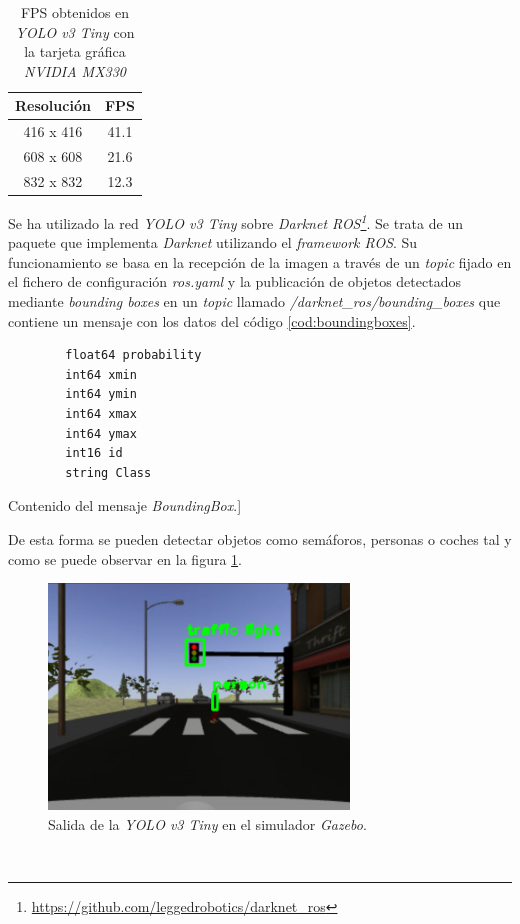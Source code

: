 \begin{table}[H]
	\begin{center}
		\begin{tabular}{|c|c|}
			\hline
			\textbf{Resolución}   & \textbf{FPS}
			\\
			\hline
			416 x 416							& 41.1
			\\
			608 x 608    					& 21.6
			\\
			832 x 832      				& 12.3
			\\
			\hline
		\end{tabular}
		\caption{FPS obtenidos en \textit{YOLO v3 Tiny} con la tarjeta gráfica \textit{NVIDIA MX330}}
		\label{table:versusnotebook}
	\end{center}
\end{table}



Se ha utilizado la red \textit{YOLO v3 Tiny} sobre \textit{Darknet ROS\footnote{\url{https://github.com/leggedrobotics/darknet_ros}}}. Se trata de un paquete que implementa \textit{Darknet} utilizando el \textit{framework ROS}. Su funcionamiento se basa en la recepción de la imagen a través de un \textit{topic} fijado en el fichero de configuración \textit{ros.yaml} y la publicación de objetos detectados mediante \textit{bounding boxes} en un \textit{topic} llamado \textit{/darknet\_ros/bounding\_boxes} que contiene un mensaje con los datos del código \ref{cod:boundingboxes}.\\

\begin{code}[h]
	\begin{lstlisting}
		float64 probability
		int64 xmin
		int64 ymin
		int64 xmax
		int64 ymax
		int16 id
		string Class
	\end{lstlisting}
	\caption[Contenido del mensaje \textit{BoundingBox}.][Contenido del mensaje \textit{BoundingBox}.]
	\label{cod:boundingboxes}
\end{code}

De esta forma se pueden detectar objetos como semáforos, personas o coches tal y como se puede observar en la figura \ref{fig:darknetsimulator}.\\

\begin{figure} [h!]
	\begin{center}
		\includegraphics[width=8cm]{figs/darknetSimulator}
	\end{center}
	\caption{Salida de la \textit{YOLO v3 Tiny} en el simulador \textit{Gazebo}.}
	\label{fig:darknetsimulator}
\end{figure}\

